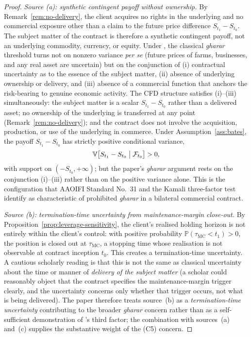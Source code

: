 \documentclass[preprint,12pt,authoryear]{elsarticle}
\newcommand{\PP}{\mathbb{P}}
\newcommand{\VV}{\mathbb{V}}
\newcommand{\FF}{\mathcal{F}}
\theoremstyle{definition}
\begin{document}
\begin{proof}
\emph{Source (a): synthetic contingent payoff without
ownership.} By Remark~\ref{rem:no-delivery}, the client acquires
no rights in the underlying and no commercial exposure other
than a claim to the future price difference $S_{t_1} - S_{t_0}$.
The subject matter of the contract is therefore a synthetic
contingent payoff, not an underlying commodity, currency, or
equity. Under \citet{Kamali2000}, the classical \emph{gharar}
threshold turns not on nonzero variance \emph{per se}
(future prices of farms, businesses, and any real asset are
uncertain) but on the conjunction of (i) contractual
uncertainty as to the essence of the subject matter,
(ii) absence of underlying ownership or delivery, and
(iii) absence of a commercial function that anchors the
risk-bearing to genuine economic activity. The CFD structure
satisfies (i)--(iii) simultaneously: the subject matter is a
scalar $S_{t_1} - S_{t_0}$ rather than a delivered asset; no
ownership of the underlying is transferred at any point
(Remark~\ref{rem:no-delivery}); and the contract does not
involve the acquisition, production, or use of the underlying
in commerce. Under Assumption~\ref{ass:bates}, the payoff
$S_{t_1} - S_{t_0}$ has strictly positive conditional
variance,
\begin{equation}
    \VV\bigl[ S_{t_1} - S_{t_0} \bigm| \FF_{t_0} \bigr] > 0,
    \label{eq:variance-positive}
\end{equation}
with support on $(-S_{t_0}, +\infty)$; but the paper's
\emph{gharar} argument rests on the conjunction (i)--(iii)
rather than on the positive variance alone. This is the
configuration that AAOIFI Standard No.~31 and the Kamali
three-factor test identify as characteristic of prohibited
\emph{gharar} in a bilateral commercial contract.

\emph{Source (b): termination-time uncertainty from
maintenance-margin close-out.} By
Proposition~\ref{prop:leverage-sensitivity}, the client's realised
holding horizon is not entirely within the client's control: with
positive probability $\PP(\tau_{\text{MC}} < t_1) > 0$, the position
is closed out at $\tau_{\text{MC}}$, a stopping time whose
realisation is not observable at contract inception $t_0$. This
creates a termination-time uncertainty. A cautious scholarly
reading is that this is not the same as classical uncertainty
about the time or manner of \emph{delivery of the subject matter}
(a scholar could reasonably object that the contract specifies the
maintenance-margin trigger clearly, and the uncertainty concerns
only whether that trigger occurs, not what is being delivered).
The paper therefore treats source~(b) as a
\emph{termination-time uncertainty} contributing to the broader
\emph{gharar} concern rather than as a self-sufficient
demonstration of \citet{Kamali2000}'s third factor; the
combination with sources~(a) and~(c) supplies the substantive
weight of the (C5) concern.


\end{proof}
\end{document}
